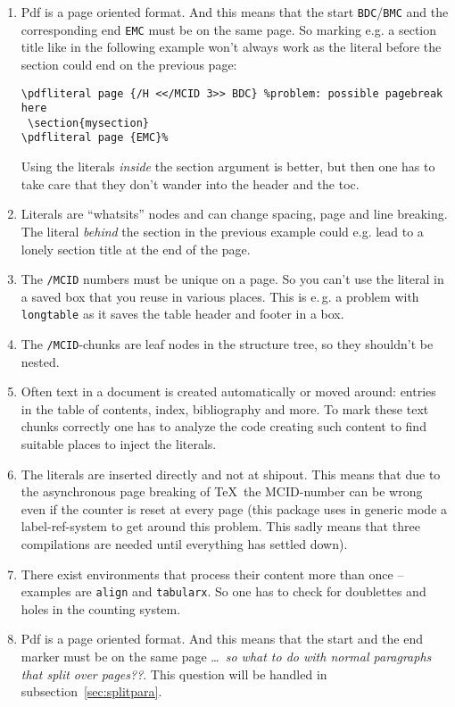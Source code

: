 \documentclass[DIV=12,parskip=half-,bibliography=totoc]{scrartcl}
\begin{document}
\begin{enumerate}[beginpenalty=10000]
  \item Pdf is a page oriented format. And this means that the start \texttt{BDC}/\texttt{BMC}  and the corresponding end \texttt{EMC} must be on the same page.
  So marking e.g. a section title like in the following example won't always work as the literal before the section could end on the previous page:

\begin{lstlisting}
\pdfliteral page {/H <</MCID 3>> BDC} %problem: possible pagebreak here
 \section{mysection}
\pdfliteral page {EMC}%
\end{lstlisting}
  Using the literals \emph{inside} the section argument is better, but then one has to take care that they don't wander into the header and the toc.

  \item Literals are \enquote{whatsits} nodes and can change spacing, page and line breaking. The literal \emph{behind} the section in the previous example could e.g. lead to a lonely section title at the end of the page.

  \item The \texttt{/MCID} numbers must be unique on a page. So you can't use the literal in a saved box that you reuse in various places. This is e.\,g. a problem with \texttt{longtable} as it saves the table header and footer in a box.

  \item The  \texttt{/MCID}-chunks are leaf nodes in the structure tree, so they shouldn't be nested.

  \item Often text in a document is created automatically or moved around: entries in the table of contents, index, bibliography and more. To mark these text chunks correctly one has to analyze the code creating such content to find suitable places to inject the literals.

  \item The literals are inserted directly and not at shipout. This means that due to the asynchronous page breaking of \TeX\ the MCID-number can be wrong even if the counter is reset at every page (this package uses in generic mode a label-ref-system to get around this problem. This sadly means that three compilations are needed until everything has settled down).

  \item There exist environments that process their content more than once -- examples are \texttt{align} and \texttt{tabularx}.
       So one has to check for doublettes and holes in the counting system.

  \item Pdf is a page oriented format. And this means that the start and the end marker must be on the same page \ldots\ \emph{so what to do with normal paragraphs that split over pages??}. This question will be handled in subsection~\ref{sec:splitpara}.
\end{enumerate}
\end{document}
